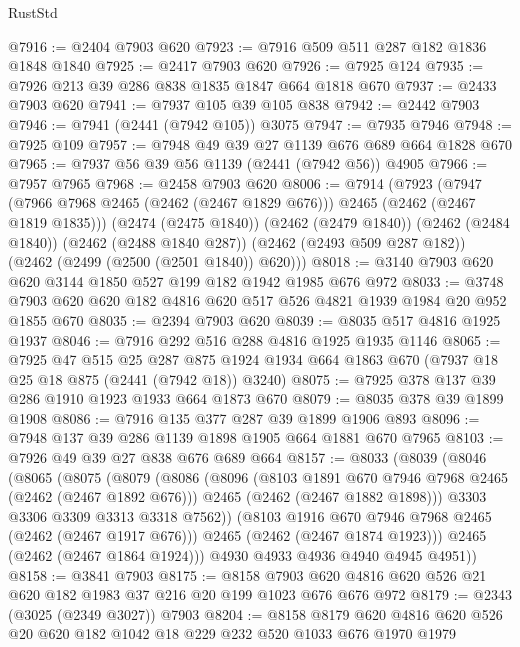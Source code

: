 \begin{lexlean}{RustStd}
\begin{coremodule}
@7916 := @2404 @7903 @620
@7923 := @7916 @509 @511 @287 @182 @1836 @1848 @1840
@7925 := @2417 @7903 @620
@7926 := @7925 @124
@7935 := @7926 @213 @39 @286 @838 @1835 @1847 @664 @1818 @670
@7937 := @2433 @7903 @620
@7941 := @7937 @105 @39 @105 @838
@7942 := @2442 @7903
@7946 := @7941 (@2441 (@7942 @105)) @3075
@7947 := @7935 @7946
@7948 := @7925 @109
@7957 := @7948 @49 @39 @27 @1139 @676 @689 @664 @1828 @670
@7965 := @7937 @56 @39 @56 @1139 (@2441 (@7942 @56)) @4905
@7966 := @7957 @7965
@7968 := @2458 @7903 @620
@8006 := @7914
    (@7923
      (@7947 (@7966 @7968 @2465 (@2462 (@2467 @1829 @676))) @2465 (@2462 (@2467 @1819 @1835)))
      (@2474 (@2475 @1840))
      (@2462 (@2479 @1840))
      (@2462 (@2484 @1840))
      (@2462 (@2488 @1840 @287))
      (@2462 (@2493 @509 @287 @182))
      (@2462 (@2499 (@2500 (@2501 @1840)) @620)))
@8018 := @3140 @7903 @620 @620 @3144 @1850 @527 @199 @182 @1942 @1985 @676 @972
@8033 := @3748 @7903 @620 @620 @182 @4816 @620 @517 @526 @4821 @1939 @1984 @20 @952 @1855 @670
@8035 := @2394 @7903 @620
@8039 := @8035 @517 @4816 @1925 @1937
@8046 := @7916 @292 @516 @288 @4816 @1925 @1935 @1146
@8065 := @7925
    @47
    @515
    @25
    @287
    @875
    @1924
    @1934
    @664
    @1863
    @670
    (@7937 @18 @25 @18 @875 (@2441 (@7942 @18)) @3240)
@8075 := @7925 @378 @137 @39 @286 @1910 @1923 @1933 @664 @1873 @670
@8079 := @8035 @378 @39 @1899 @1908
@8086 := @7916 @135 @377 @287 @39 @1899 @1906 @893
@8096 := @7948 @137 @39 @286 @1139 @1898 @1905 @664 @1881 @670 @7965
@8103 := @7926 @49 @39 @27 @838 @676 @689 @664
@8157 := @8033
    (@8039
      (@8046
        (@8065
          (@8075
            (@8079
              (@8086
                (@8096
                  (@8103 @1891 @670 @7946 @7968 @2465 (@2462 (@2467 @1892 @676)))
                  @2465
                  (@2462 (@2467 @1882 @1898)))
                @3303
                @3306
                @3309
                @3313
                @3318
                @7562))
            (@8103 @1916 @670 @7946 @7968 @2465 (@2462 (@2467 @1917 @676)))
            @2465
            (@2462 (@2467 @1874 @1923)))
          @2465
          (@2462 (@2467 @1864 @1924)))
        @4930
        @4933
        @4936
        @4940
        @4945
        @4951))
@8158 := @3841 @7903
@8175 := @8158 @7903 @620 @4816 @620 @526 @21 @620 @182 @1983 @37 @216 @20 @199 @1023 @676 @676 @972
@8179 := @2343 (@3025 (@2349 @3027)) @7903
@8204 := @8158
    @8179
    @620
    @4816
    @620
    @526
    @20
    @620
    @182
    @1042
    @18
    @229
    @232
    @520
    @1033
    @676
    @1970
    @1979

\end{coremodule}
\end{lexlean}
